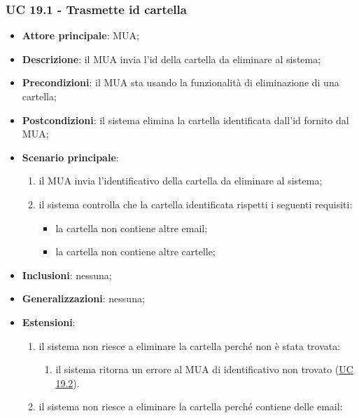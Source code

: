 \subsubsection{UC 19.1 - Trasmette id cartella} \label{sec:UC19.1}
    \begin{itemize}
        \item \textbf{Attore principale}: MUA;
        \item \textbf{Descrizione}: il MUA invia l'id della cartella da eliminare al sistema;
        \item \textbf{Precondizioni}: il MUA sta usando la funzionalità di eliminazione di una cartella;
        \item \textbf{Postcondizioni}: il sistema elimina la cartella identificata dall'id fornito dal MUA;
        \item \textbf{Scenario principale}:
            \begin{enumerate}
                \item il MUA invia l'identificativo della cartella da eliminare al sistema;
                \item il sistema controlla che la cartella identificata rispetti i seguenti requisiti:
                \begin{itemize}
                    \item la cartella non contiene altre email;
                    \item la cartella non contiene altre cartelle;
                \end{itemize}
            \end{enumerate}
        \item \textbf{Inclusioni}: nessuna;
        \item \textbf{Generalizzazioni}: nessuna;
        \item \textbf{Estensioni}:
            \begin{enumerate}[label=\alph*.]
                \item il sistema non riesce a eliminare la cartella perché non è stata trovata:
                \begin{enumerate}[label=\arabic*.]
                    \item il sistema ritorna un errore al MUA di identificativo non trovato (\hyperref[sec:UC19.2]{UC 19.2}).
                \end{enumerate}
                \item il sistema non riesce a eliminare la cartella perché contiene delle email:
                \begin{enumerate}[label=\arabic*.]

\end{enumerate}
\end{enumerate}
\end{itemize}
